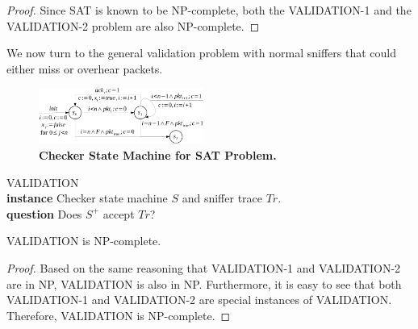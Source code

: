 \begin{proof}

  Since SAT is known to be NP-complete, both the VALIDATION-1 and the
  VALIDATION-2 problem are also NP-complete.
\end{proof}

We now turn to the general validation problem with normal sniffers that could
either miss or overhear packets.

\begin{figure}[t]
  \centering
  \includegraphics[width=0.48\textwidth]{./figures/sat_sm.pdf}
  \caption{\textbf{Checker State Machine for SAT Problem.}}
  \label{fig:sat}
\end{figure}



\begin{problem}
  VALIDATION\\
  \textbf{instance} Checker state machine $S$ and sniffer trace $Tr$.\\
  \textbf{question} Does $S^+$ accept $Tr$?
\end{problem}

\begin{theorem}
  VALIDATION is NP-complete.
\end{theorem}
\begin{proof}
  Based on the same reasoning that VALIDATION-1 and VALIDATION-2 are
  in NP, VALIDATION is also in NP. Furthermore, it is easy to see that both
  VALIDATION-1 and VALIDATION-2 are special instances of
  VALIDATION. Therefore, VALIDATION is NP-complete.
\end{proof}
